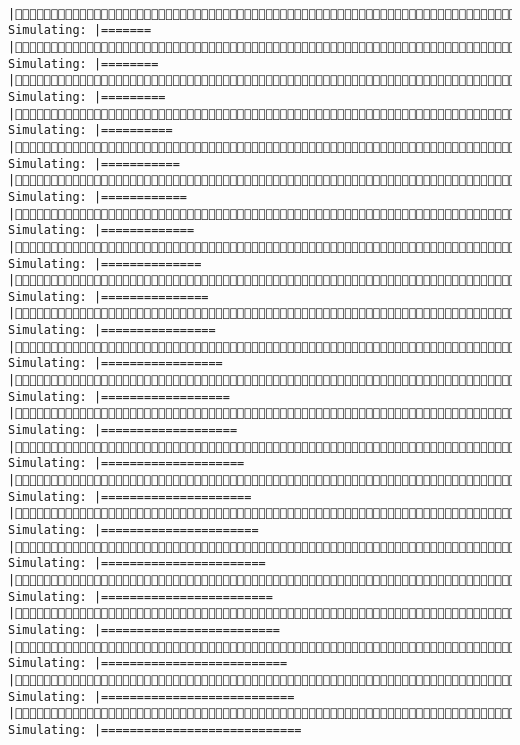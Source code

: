 \documentclass[]{article}
\begin{document}
\begin{verbatim}
     |(4/4) Simulating: |=======                                                |(4/4) Simulating: |========                                               |(4/4) Simulating: |=========                                              |(4/4) Simulating: |==========                                             |(4/4) Simulating: |===========                                            |(4/4) Simulating: |============                                           |(4/4) Simulating: |=============                                          |(4/4) Simulating: |==============                                         |(4/4) Simulating: |===============                                        |(4/4) Simulating: |================                                       |(4/4) Simulating: |=================                                      |(4/4) Simulating: |==================                                     |(4/4) Simulating: |===================                                    |(4/4) Simulating: |====================                                   |(4/4) Simulating: |=====================                                  |(4/4) Simulating: |======================                                 |(4/4) Simulating: |=======================                                |(4/4) Simulating: |========================                               |(4/4) Simulating: |=========================                              |(4/4) Simulating: |==========================                             |(4/4) Simulating: |===========================                            |(4/4) Simulating: |============================                           
\end{verbatim}
\end{document}
